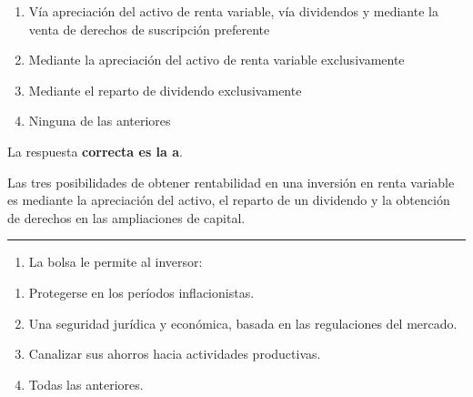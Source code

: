 \documentclass[
  letterpaper,
  DIV=11,
  numbers=noendperiod]{scrreprt}
\providecommand{\tightlist}{%
  \setlength{\itemsep}{0pt}\setlength{\parskip}{0pt}}\usepackage{longtable,booktabs,array}
\begin{document}
\begin{enumerate}
\def\labelenumi{\alph{enumi})}
\item
  Vía apreciación del activo de renta variable, vía dividendos y
  mediante la venta de derechos de suscripción preferente
\item
  Mediante la apreciación del activo de renta variable exclusivamente
\item
  Mediante el reparto de dividendo exclusivamente
\item
  Ninguna de las anteriores
\end{enumerate}

\begin{tcolorbox}[enhanced jigsaw, left=2mm, opacityback=0, colback=white, breakable, arc=.35mm, bottomrule=.15mm, rightrule=.15mm, toprule=.15mm, leftrule=.75mm, colframe=quarto-callout-tip-color-frame]
\begin{minipage}[t]{5.5mm}
\textcolor{quarto-callout-tip-color}{\faLightbulb}
\end{minipage}%
\begin{minipage}[t]{\textwidth - 5.5mm}

La respuesta \textbf{correcta es la a}.

Las tres posibilidades de obtener rentabilidad en una inversión en renta
variable es mediante la apreciación del activo, el reparto de un
dividendo y la obtención de derechos en las ampliaciones de capital.

\end{minipage}%
\end{tcolorbox}

\begin{center}\rule{0.5\linewidth}{0.5pt}\end{center}

\begin{enumerate}
\def\labelenumi{\arabic{enumi}.}
\setcounter{enumi}{21}
\tightlist
\item
  La bolsa le permite al inversor:
\end{enumerate}

\begin{enumerate}
\def\labelenumi{\alph{enumi})}
\item
  Protegerse en los períodos inflacionistas.
\item
  Una seguridad jurídica y económica, basada en las regulaciones del
  mercado.
\item
  Canalizar sus ahorros hacia actividades productivas.
\item
  Todas las anteriores.
\end{enumerate}
\end{document}
